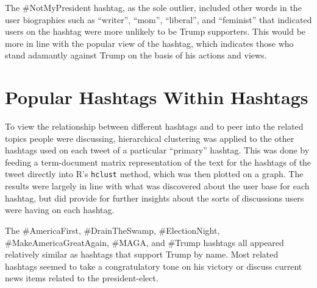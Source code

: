 \documentclass[prodmode]{acmsmall} %
\begin{document}

The \#NotMyPresident hashtag, as the sole outlier, included other words in the
user biographies such as ``writer'', ``mom'', ``liberal'', and ``feminist'' that
indicated users on the hashtag were more unlikely to be Trump supporters. This
would be more in line with the popular view of the hashtag, which indicates
those who stand adamantly against Trump on the basis of his actions and views.

\section{Popular Hashtags Within Hashtags}
To view the relationship between different hashtags and to peer into the related
topics people were discussing, hierarchical clustering was applied to the other
hashtags used on each tweet of a particular ``primary'' hashtag. This was done
by feeding a term-document matrix representation of the text for the hashtags of
the tweet directly into R's \verb|hclust| method, which was then plotted on a
graph. The results were largely in line with what was discovered about the user
base for each hashtag, but did provide for further insights about the sorts of
discussions users were having on each hashtag.

The \#AmericaFirst, \#DrainTheSwamp, \#ElectionNight, \#MakeAmericaGreatAgain,
\#MAGA, and \#Trump hashtags all appeared relatively similar as hashtags that
support Trump by name. Most related hashtags seemed to take a congratulatory
tone on his victory or discuss current news items related to the
president-elect.
\end{document}
